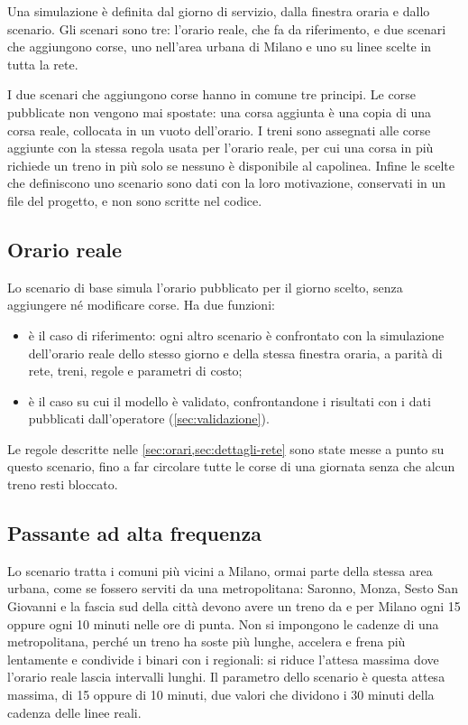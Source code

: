 Una simulazione è definita dal giorno di servizio, dalla finestra oraria e dallo scenario. Gli scenari sono tre: l'orario reale, che fa da riferimento, e due scenari che aggiungono corse, uno nell'area urbana di Milano e uno su linee scelte in tutta la rete.

I due scenari che aggiungono corse hanno in comune tre principi. Le corse pubblicate non vengono mai spostate: una corsa aggiunta è una copia di una corsa reale, collocata in un vuoto dell'orario. I treni sono assegnati alle corse aggiunte con la stessa regola usata per l'orario reale, per cui una corsa in più richiede un treno in più solo se nessuno è disponibile al capolinea. Infine le scelte che definiscono uno scenario sono dati con la loro motivazione, conservati in un file del progetto, e non sono scritte nel codice.

\subsection{Orario reale}
Lo scenario di base simula l'orario pubblicato per il giorno scelto, senza aggiungere né modificare corse. Ha due funzioni:
\begin{itemize}
	\item è il caso di riferimento: ogni altro scenario è confrontato con la simulazione dell'orario reale dello stesso giorno e della stessa finestra oraria, a parità di rete, treni, regole e parametri di costo;
	\item è il caso su cui il modello è validato, confrontandone i risultati con i dati pubblicati dall'operatore (\cref{sec:validazione}).
\end{itemize}
Le regole descritte nelle \cref{sec:orari,sec:dettagli-rete} sono state messe a punto su questo scenario, fino a far circolare tutte le corse di una giornata senza che alcun treno resti bloccato.

\subsection{Passante ad alta frequenza}
Lo scenario tratta i comuni più vicini a Milano, ormai parte della stessa area urbana, come se fossero serviti da una metropolitana: Saronno, Monza, Sesto San Giovanni e la fascia sud della città devono avere un treno da e per Milano ogni 15 oppure ogni 10 minuti nelle ore di punta. Non si impongono le cadenze di una metropolitana, perché un treno ha soste più lunghe, accelera e frena più lentamente e condivide i binari con i regionali: si riduce l'attesa massima dove l'orario reale lascia intervalli lunghi. Il parametro dello scenario è questa attesa massima, di 15 oppure di 10 minuti, due valori che dividono i 30 minuti della cadenza delle linee reali.

